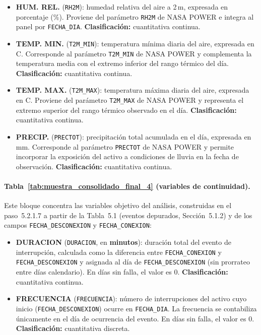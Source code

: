 \begin{itemize}
    \item \textbf{HUM. REL.} (\texttt{RH2M}): humedad relativa del aire a 2\,m, expresada en porcentaje (\%). Proviene del parámetro \texttt{RH2M} de NASA POWER e integra al panel por \texttt{FECHA\_DIA}. \textbf{Clasificación:} cuantitativa continua.

    \item \textbf{TEMP. MIN.} (\texttt{T2M\_MIN}): temperatura mínima diaria del aire, expresada en \textdegree C. Corresponde al parámetro \texttt{T2M\_MIN} de NASA POWER y complementa la temperatura media con el extremo inferior del rango térmico del día. \textbf{Clasificación:} cuantitativa continua.

    \item \textbf{TEMP. MAX.} (\texttt{T2M\_MAX}): temperatura máxima diaria del aire, expresada en \textdegree C. Proviene del parámetro \texttt{T2M\_MAX} de NASA POWER y representa el extremo superior del rango térmico observado en el día. \textbf{Clasificación:} cuantitativa continua.

    \item \textbf{PRECIP.} (\texttt{PRECTOT}): precipitación total acumulada en el día, expresada en mm. Corresponde al parámetro \texttt{PRECTOT} de NASA POWER y permite incorporar la exposición del activo a condiciones de lluvia en la fecha de observación. \textbf{Clasificación:} cuantitativa continua.
\end{itemize}

\paragraph{Tabla~\ref{tab:muestra_consolidado_final_4} (variables de continuidad).}
Este bloque concentra las variables objetivo del análisis, construidas en el paso~5.2.1.7 a partir de la Tabla~5.1 (eventos depurados, Sección~5.1.2) y de los campos \texttt{FECHA\_DESCONEXION} y \texttt{FECHA\_CONEXION}:

\begin{itemize}
    \item \textbf{DURACION} (\texttt{DURACION}, en \textbf{minutos}): duración total del evento de interrupción, calculada como la diferencia entre \texttt{FECHA\_CONEXION} y \texttt{FECHA\_DESCONEXION} y asignada al día de \texttt{FECHA\_DESCONEXION} (sin prorrateo entre días calendario). En días sin falla, el valor es $0$. \textbf{Clasificación:} cuantitativa continua.

    \item \textbf{FRECUENCIA} (\texttt{FRECUENCIA}): número de interrupciones del activo cuyo inicio (\texttt{FECHA\_DESCONEXION}) ocurre en \texttt{FECHA\_DIA}. La frecuencia se contabiliza únicamente en el día de ocurrencia del evento. En días sin falla, el valor es $0$. \textbf{Clasificación:} cuantitativa discreta.
\end{itemize}




